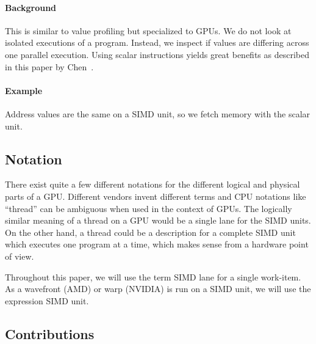 \paragraph{Background} This is similar to value profiling but specialized to GPUs. We do not look at isolated executions of a program. Instead, we inspect if values are differing across one parallel execution. Using scalar instructions yields great benefits as described in this paper by Chen~\cite{Chen2016}.
\paragraph{Example} Address values are the same on a SIMD unit, so we fetch memory with the scalar unit.

\subsection{Notation}
\label{sub:notation}
There exist quite a few different notations for the different logical and physical parts of a GPU. Different vendors invent different terms and CPU notations like \enquote{thread} can be ambiguous when used in the context of GPUs. The logically similar meaning of a thread on a GPU would be a single lane for the SIMD units. On the other hand, a thread could be a description for a complete SIMD unit which executes one program at a time, which makes sense from a hardware point of view.

Throughout this paper, we will use the term SIMD lane for a single work-item. As a wavefront (AMD) or warp (NVIDIA) is run on a SIMD unit, we will use the expression SIMD unit.


\subsection{Contributions}
\label{sub:contributions}

